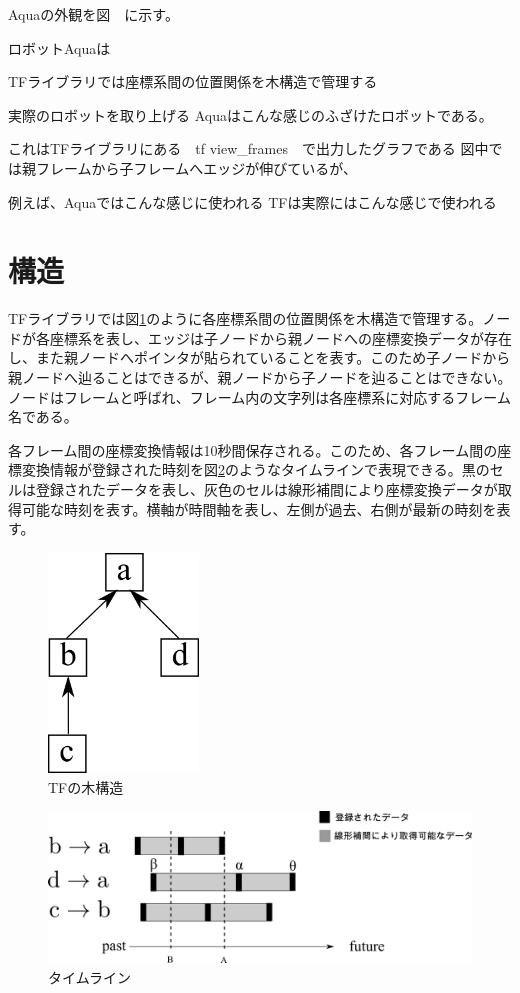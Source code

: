 \documentclass[a4paper]{jreport}	%
\begin{document}
Aquaの外観を図　に示す。

ロボットAquaは

TFライブラリでは座標系間の位置関係を木構造で管理する


実際のロボットを取り上げる
Aquaはこんな感じのふざけたロボットである。

これはTFライブラリにある　tf view\_frames　で出力したグラフである
図中では親フレームから子フレームへエッジが伸びているが、

例えば、Aquaではこんな感じに使われる
TFは実際にはこんな感じで使われる


\section{構造}
TFライブラリでは図\ref{fig:sample-tree}のように各座標系間の位置関係を木構造で管理する。ノードが各座標系を表し、エッジは子ノードから親ノードへの座標変換データが存在し、また親ノードへポインタが貼られていることを表す。このため子ノードから親ノードへ辿ることはできるが、親ノードから子ノードを辿ることはできない。ノードはフレームと呼ばれ、フレーム内の文字列は各座標系に対応するフレーム名である。

各フレーム間の座標変換情報は10秒間保存される。このため、各フレーム間の座標変換情報が登録された時刻を図\ref{fig:general-timeline}のようなタイムラインで表現できる。黒のセルは登録されたデータを表し、灰色のセルは線形補間により座標変換データが取得可能な時刻を表す。横軸が時間軸を表し、左側が過去、右側が最新の時刻を表す。

\begin{figure}[h] 
\centering
\includegraphics[width=4cm]{sample-tree}	
\caption{TFの木構造}
\label{fig:sample-tree}
\end{figure}

\begin{figure}[h] 
\centering
\includegraphics[width=15cm]{general-timeline.png}
\caption{タイムライン}
\label{fig:general-timeline}
\end{figure}
\end{document}
